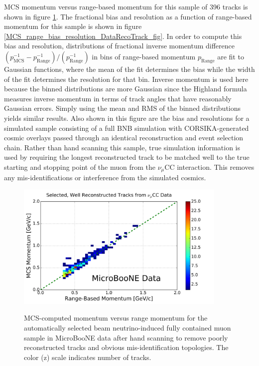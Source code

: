\documentclass[a4paper,11pt]{article}
\begin{document}
MCS momentum versus range-based momentum for this sample of 396 tracks is shown in figure \ref{realdata_goodhandscan_fig}. The fractional bias and resolution as a function of range-based momentum for this sample is shown in figure \ref{MCS_range_bias_resolution_DataRecoTrack_fig}. In order to compute this bias and resolution, distributions of fractional inverse momentum difference $(p_{\text{MCS}}^{-1} - p_{\text{Range}}^{-1})/(p_{\text{Range}}^{-1})$ in bins of range-based momentum $p_{\text{Range}}$ are fit to Gaussian functions, where the mean of the fit determines the bias while the width of the fit determines the resolution for that bin. Inverse momentum is used here because the binned distributions are more Gaussian since the Highland formula measures inverse momentum in terms of track angles that have reasonably Gaussian errors. Simply using the mean and RMS of the binned distributions yields similar results. Also shown in this figure are the bias and resolutions for a simulated sample consisting of a full BNB simulation with CORSIKA-generated \cite{corsika_ref} cosmic overlays passed through an identical reconstruction and event selection chain. Rather than hand scanning this sample, true simulation information is used by requiring the longest reconstructed track to be matched well to the true starting and stopping point of the muon from the $\nu_\mu$CC interaction. This removes any mis-identifications or interference from the simulated cosmics. 

\begin{figure}[ht!]
\centering
	\includegraphics[width=0.9\textwidth]{Figures/MCS_range_momentum_DataRecoTracks_goodhandscan.png} \\
\caption{MCS-computed momentum versus range momentum for the automatically selected beam neutrino-induced fully contained muon sample in MicroBooNE data after hand scanning to remove poorly reconstructed tracks and obvious mis-identification topologies. The color (z) scale indicates number of tracks.}\label{realdata_goodhandscan_fig}
\end{figure}
\end{document}
